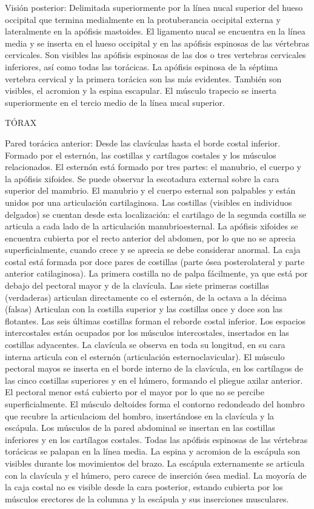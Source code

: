 Visión posterior: Delimitada superiormente por la línea nucal superior del hueso occipital que termina medialmente en la protuberancia occipital externa y lateralmente en la apófisis mastoides.
El ligamento nucal se encuentra en la línea media y se inserta en el hueso occipital y en las apófisis espinosas de las vértebras cervicales. Son visibles las apófisis espinosas de las dos o tres vertebras cervicales inferiores, así como todas las torácicas. La apófisis espinosa de la séptima vertebra cervical  y la primera torácica son las más evidentes. También son visibles, el acromion y la espina escapular.
El músculo trapecio se inserta superiormente en el tercio medio de la línea nucal superior.


TÓRAX

Pared torácica anterior: Desde las clavículas hasta el borde costal inferior. Formado por el esternón, las costillas y cartílagos costales y los músculos relacionados.
El esternón está formado por tres partes: el manubrio, el cuerpo y la apófisis xifoides. Se puede observar la escotadura external sobre la cara superior del manubrio. El manubrio y el cuerpo esternal son palpables y están unidos por una articulación cartilaginosa. Las costillas (visibles en individuos delgados) se cuentan desde esta localización: el cartilago de la segunda costilla se articula a cada lado de la articulación manubrioesternal. La apófisis xifoides se encuentra cubierta por el recto anterior del abdomen, por lo que no se aprecia superficialmente, cuando crece y se aprecia se debe considerar anormal.
La caja costal está formada por doce pares de costillas (parte ósea posterolateral y parte anterior catilaginosa). La primera costilla no de palpa fácilmente, ya que está por debajo del pectoral mayor y de la clavícula. Las siete primeras costillas (verdaderas) articulan directamente co el esternón, de la octava a la décima (falsas) Articulan con la costilla superior y las costillas once y doce son las flotantes. Las seis últimas costillas forman el reborde costal inferior. Los espacios intercostales están ocupados por los músculos intercostales, insertados en las costillas adyacentes.
La clavícula se observa en toda su longitud, en su cara interna articula con  el esternón (articulación esternoclavicular).
El músculo pectoral mayos se inserta en el borde interno de la clavícula, en los cartílagos de las cinco costillas superiores y en el húmero, formando el pliegue axilar anterior. El pectoral menor está cubierto por el mayor por lo que no se percibe superficialmente.
El músculo deltoides forma el contorno redondeado del hombro que recubre la articulaciom del hombro, insertándose en la clavícula y la escápula.
Los músculos de la pared abdominal se insertan en las costillas inferiores y en los cartílagos costales.
Todas las apófisis espinosas de las vértebras torácicas se palapan en la línea media. La espina y acromion de la escápula son visibles durante los movimientos del brazo. La escápula externamente se articula con la clavícula y el húmero, pero carece de inserción ósea medial. La moyoría de la caja costal no es visible desde la cara posterior, estando cubierta por los músculos erectores de la columna y la escápula y sus inserciones musculares.

